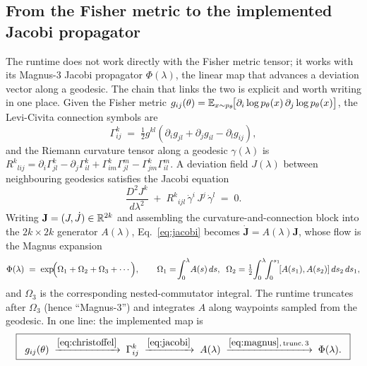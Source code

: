 \documentclass[11pt]{article}
\begin{document}
\subsection{From the Fisher metric to the implemented Jacobi propagator}
\label{sec:fisher-to-jacobi}
The runtime does not work directly with the Fisher metric tensor; it works
with its Magnus-3 Jacobi propagator $\Phi(\lambda)$, the linear map that
advances a deviation vector along a geodesic.  The chain that links the two
is explicit and worth writing in one place.  Given the Fisher metric
$g_{ij}(\theta)=\mathbb{E}_{x\sim p_\theta}\!\bigl[\partial_i\log p_\theta(x)\,
\partial_j\log p_\theta(x)\bigr]$, the Levi-Civita connection symbols are
\begin{equation}
\Gamma^k_{ij}\;=\;\tfrac{1}{2}g^{kl}\!\left(\partial_i g_{jl}+\partial_j g_{il}-\partial_l g_{ij}\right),
\label{eq:christoffel}
\end{equation}
and the Riemann curvature tensor along a geodesic $\gamma(\lambda)$ is
$R^k{}_{lij}=\partial_i\Gamma^k_{jl}-\partial_j\Gamma^k_{il}
+\Gamma^k_{im}\Gamma^m_{jl}-\Gamma^k_{jm}\Gamma^m_{il}$.  A
deviation field $J(\lambda)$ between neighbouring geodesics satisfies the
Jacobi equation
\begin{equation}
\frac{D^2 J^k}{d\lambda^2}\;+\;R^k{}_{ijl}\,\dot\gamma^i\,J^j\,\dot\gamma^l\;=\;0.
\label{eq:jacobi}
\end{equation}
Writing $\mathbf{J}=(J,\dot J)\in\mathbb{R}^{2k}$ and assembling the
curvature-and-connection block into the $2k\times2k$ generator
$A(\lambda)$, Eq.~\eqref{eq:jacobi} becomes
$\dot{\mathbf{J}}=A(\lambda)\mathbf{J}$, whose flow is the Magnus expansion
\cite{magnus1954}
\begin{equation}
\Phi(\lambda)\;=\;\exp\!\Bigl(\Omega_1+\Omega_2+\Omega_3+\cdots\Bigr),\qquad
\Omega_1=\!\int_0^\lambda\!A(s)\,ds,\;\;
\Omega_2=\tfrac{1}{2}\!\int_0^\lambda\!\!\int_0^{s_1}\![A(s_1),A(s_2)]\,ds_2\,ds_1,
\label{eq:magnus}
\end{equation}
and $\Omega_3$ is the corresponding nested-commutator integral.  The runtime
truncates after $\Omega_3$ (hence ``Magnus-3'') and integrates $A$ along
waypoints sampled from the geodesic.  In one line: the implemented map is
\begin{equation}
\boxed{\;\;g_{ij}(\theta)\;\xrightarrow{\eqref{eq:christoffel}}\;\Gamma^k_{ij}\;\xrightarrow{\eqref{eq:jacobi}}\;A(\lambda)\;\xrightarrow{\eqref{eq:magnus},\,\text{trunc.\,3}}\;\Phi(\lambda).\;\;}
\label{eq:fisher-to-phi}
\end{equation}
\end{document}
